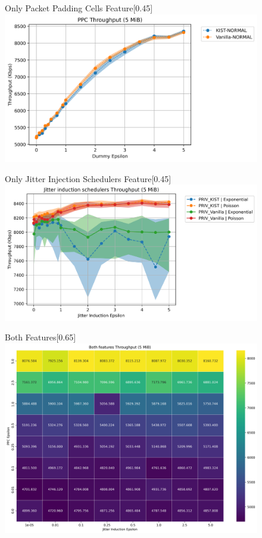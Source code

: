 \begin{figure}[htbp]
    \centering
    \begin{subcaptionbox}{Only Packet Padding Cells Feature}[0.45\textwidth]
        {\includegraphics[width=\linewidth]{Chapters/Figures/Plots/local_throughput_50_PPC_5mib.png}\label{fig:local_ppc_throughput}}
    \end{subcaptionbox}
    \hfill
    \begin{subcaptionbox}{Only Jitter Injection Schedulers Feature\label{fig:local_jitter_throughput}}[0.45\textwidth]
        {\includegraphics[width=\linewidth]{Chapters/Figures/Plots/local_throughput_50_jitter_5mib.png}}
    \end{subcaptionbox}
    \vfill
    \begin{subcaptionbox}{Both Features\label{fig:local_both_throughput}}[0.65\textwidth]
        {\includegraphics[width=\linewidth]{Chapters/Figures/Plots/local_throughput_50_heatmap_5mib.png}}

\end{subcaptionbox}
\end{figure}
